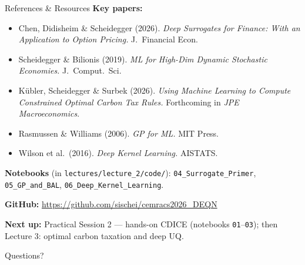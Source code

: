 \documentclass[aspectratio=169,11pt]{beamer}
\newcommand{\emphc}[1]{\textcolor{harvardcrimson}{#1}}
\begin{document}
\begin{frame}[shrink=5]{References \& Resources}
\footnotesize
\textbf{Key papers:}
\begin{itemize}\itemsep0pt \parskip0pt
  \item Chen, Didisheim \& Scheidegger (2026). \emph{Deep Surrogates for Finance: With an Application to Option Pricing.} J.\ Financial Econ.
  \item Scheidegger \& Bilionis (2019). \emph{ML for High-Dim Dynamic Stochastic Economies.} J.\ Comput.\ Sci.
  \item K\"ubler, Scheidegger \& Surbek (2026). \emph{Using Machine Learning to Compute Constrained Optimal Carbon Tax Rules.} Forthcoming in \emph{JPE Macroeconomics}.
  \item Rasmussen \& Williams (2006). \emph{GP for ML.} MIT Press.
  \item Wilson et al.\ (2016). \emph{Deep Kernel Learning.} AISTATS.
\end{itemize}

\vspace{0.1cm}
{\tiny \textbf{Notebooks} (in \texttt{lectures/lecture\_2/code/}): \texttt{04\_Surrogate\_Primer}, \texttt{05\_GP\_and\_BAL}, \texttt{06\_Deep\_Kernel\_Learning}.}

\vspace{0.15cm}
\textbf{GitHub:} \url{https://github.com/sischei/cemracs2026_DEQN}

\vspace{0.1cm}
{\small \textbf{Next up:} Practical Session 2 --- hands-on CDICE (notebooks \texttt{01}--\texttt{03}); then Lecture 3: optimal carbon taxation and deep UQ.}

\vspace{0.2cm}
\begin{center}
{\LARGE \emphc{Questions?}}
\end{center}
\end{frame}
\end{document}
